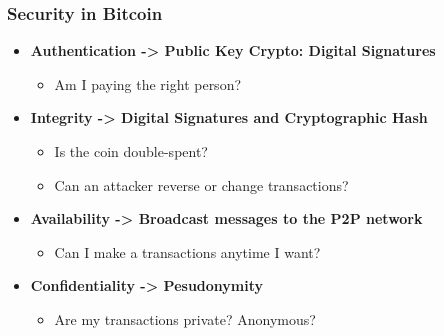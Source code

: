 \begin{frame}
    \frametitle{Security in Bitcoin}
    \begin{itemize}
        \item \textbf{Authentication -> \alert{Public Key Crypto: Digital Signatures}}
            \begin{itemize}
                \item Am I paying the right person?
            \end{itemize}
        \item \textbf{Integrity -> \alert{Digital Signatures and Cryptographic Hash}}
            \begin{itemize}
                \item Is the coin double-spent?
                \item Can an attacker reverse or change transactions?
            \end{itemize}
        \item \textbf{Availability -> \alert{Broadcast messages to the P2P network}}
            \begin{itemize}
                \item Can I make a transactions anytime I want?
            \end{itemize}
        \item \textbf{Confidentiality -> \alert{Pesudonymity}}
            \begin{itemize}
                \item Are my transactions private? Anonymous?
            \end{itemize}
    \end{itemize}
\end{frame}

